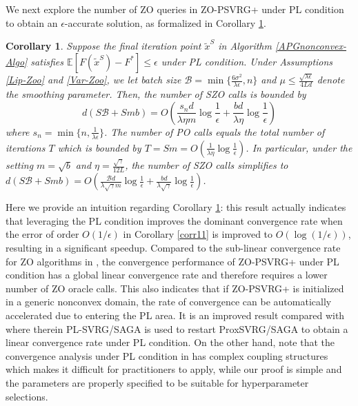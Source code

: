 \documentclass[iicol,sn-basic]{sn-jnl}
\theoremstyle{thmstyleone}%
\theoremstyle{thmstyletwo}%
\theoremstyle{thmstylethree}%
\newcommand*{\E}{\mathbb{E}}
\newtheorem{corollary}[theorem]{Corollary}
\begin{document}
We next explore the number of ZO queries in ZO-PSVRG+ under PL condition to obtain an $\epsilon$-accurate solution, as formalized in Corollary \ref{PL-Zo-Cor}. 
\begin{corollary}\label{PL-Zo-Cor}
Suppose the final iteration point $\tilde{x}^S$ in Algorithm \ref{APGnonconvex-Algo} satisfies $\E[F(\tilde{x}^S) - F^*]\leq \epsilon$ under PL condition. Under Assumptions \ref{Lip-Zoo} and \ref{Var-Zoo}, we let batch size $\mathcal{B} = \min\{\frac{6\sigma^2}{\lambda\epsilon},n\}$ and  $\mu \leq \frac{\sqrt{\lambda\epsilon}}{4 L d}$ denote the smoothing parameter. Then, the number of SZO calls is bounded by
\[
d(S\mathcal{B}+Smb) = O(\frac{s_n d}{\lambda\eta m}\log\frac{1}{\epsilon}+\frac{b d}{\lambda\eta}\log\frac{1}{\epsilon})
\]
where $s_n = \min \{n,\frac{1}{\lambda \epsilon}\}$.
The number of PO calls equals the total number of iterations $T$ which is bounded by  $T = Sm = O(\frac{1}{\lambda\eta}\log\frac{1}{\epsilon})$.
In particular, under the setting  $m=\sqrt{b}$ and $\eta = \frac{\sqrt{\gamma}}{12 L}$, the number of SZO calls simplifies to 
$d(S\mathcal{B}+Smb) = O(\frac{\mathcal{B}d}{\lambda\sqrt{\gamma} m}\log\frac{1}{\epsilon}+\frac{bd}{\lambda\sqrt{\gamma}}\log\frac{1}{\epsilon})$.
\end{corollary}

Here we provide an intuition regarding Corollary \ref{PL-Zo-Cor}: this result actually indicates that leveraging the PL condition improves the dominant convergence rate when the error of
order $O(1/\epsilon)$ in Corollary \ref{corr11} is improved to $O(\log(1/\epsilon))$, resulting in a significant speedup.
Compared to the sub-linear convergence rate for ZO algorithms in \cite{duchi2015optimal,nesterov2017random,liu2018zeroth}, the convergence performance of ZO-PSVRG+ under PL condition has a global linear convergence rate and therefore requires a lower number of ZO oracle calls. 
This also indicates that if ZO-PSVRG+ is initialized in a generic nonconvex domain, the rate of convergence can be automatically accelerated due to entering the PL area. It is an improved result compared with \cite{reddi2016stochastic} where therein PL-SVRG/SAGA is used to restart ProxSVRG/SAGA to obtain a linear convergence rate under PL condition. On the other hand, note that the convergence analysis under PL condition in \cite{ji2019improved} has complex coupling structures which makes it difficult for practitioners to apply, while our proof is simple and the parameters are properly specified to be suitable for hyperparameter selections.
\end{document}
